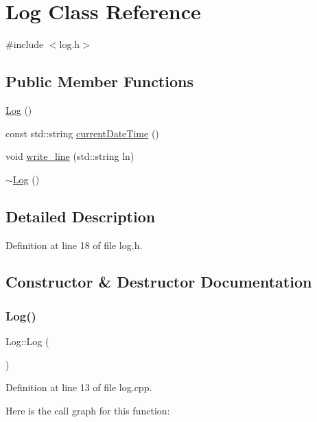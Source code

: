 \hypertarget{class_log}{}\section{Log Class Reference}
\label{class_log}


{\ttfamily \#include $<$log.\+h$>$}

\subsection*{Public Member Functions}
\begin{DoxyCompactItemize}
\item 
\mbox{\hyperlink{class_log_af6071a60aa52b6c1b511f99b4bc1b8fe}{Log}} ()
\item 
const std\+::string \mbox{\hyperlink{class_log_af056ba4ff9151d69bf1b302a95253c52}{current\+Date\+Time}} ()
\item 
void \mbox{\hyperlink{class_log_aeb1d174708785f8f763895ad8e41d580}{write\+\_\+line}} (std\+::string ln)
\item 
\mbox{\hyperlink{class_log_a0fbfda88fbee5027c89f6eb121059360}{$\sim$\+Log}} ()
\end{DoxyCompactItemize}


\subsection{Detailed Description}


Definition at line 18 of file log.\+h.



\subsection{Constructor \& Destructor Documentation}
\mbox{\label{class_log_af6071a60aa52b6c1b511f99b4bc1b8fe}} 
\subsubsection{\texorpdfstring{Log()}{Log()}}
{\footnotesize\ttfamily Log\+::\+Log (\begin{DoxyParamCaption}{ }\end{DoxyParamCaption})}



Definition at line 13 of file log.\+cpp.

Here is the call graph for this function\+:
\mbox{\label{class_log_a0fbfda88fbee5027c89f6eb121059360}} 
